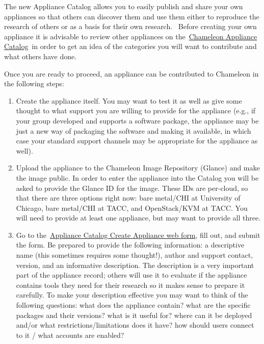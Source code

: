 The new Appliance Catalog allows you to easily publish and share your
own appliances so that others can discover them and use them either to
reproduce the research of others or as a basis for their own research.
~Before creating your own appliance it is advisable to review other
appliances on
the~\href{https://www.chameleoncloud.org/appliances/}{Chameleon
Appliance Catalog}~in order to get an idea of the categories you will
want to contribute and what others have done.~

Once you are ready to proceed, an appliance can be contributed to
Chameleon in the following steps:

\begin{enumerate}
\tightlist
\item
  Create the appliance itself. You may want to test it as well as give
  some thought to what support you are willing to provide for the
  appliance (e.g., if your group developed and supports a software
  package, the appliance may be just a new way of packaging the software
  and making it available, in which case your standard support channels
  may be appropriate for the appliance as well).
\item
  Upload the appliance to the Chameleon Image Repository (Glance) and
  make the image public. In order to enter the appliance into the
  Catalog you will be asked to provide the Glance ID for the image.
  These IDs are per-cloud, so that there are three options right now:
  bare metal/CHI at University of Chicago, bare metal/CHI at TACC, and
  OpenStack/KVM at TACC. You will need to provide at least one
  appliance, but may want to provide all three.
\item
  Go to
  the~\href{https://www.chameleoncloud.org/appliances/create/}{Appliance
  Catalog Create Appliance web form}, fill out, and submit the form. Be
  prepared to provide the following information: a descriptive name
  (this sometimes requires some thought!), author and support contact,
  version, and an informative description. The description is a very
  important part of the appliance record; others will use it to evaluate
  if the appliance contains tools they need for their research so it
  makes sense to prepare it carefully. To make your description
  effective you may want to think of the following questions: what does
  the appliance contain? what are the specific packages and their
  versions? what is it useful for? where can it be deployed and/or what
  restrictions/limitations does it have? how should users connect to it
  / what accounts are enabled?
\end{enumerate}

